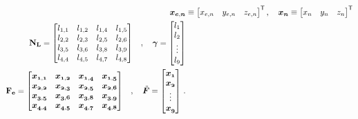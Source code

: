 \begin{subequations}
    \begin{align}
        \vec{x_{e,n}} & \equiv	\begin{bmatrix}
            x_{e,n} & y_{e,n} & z_{e,n}
        \end{bmatrix}^{\mathsf{T}}, \quad
        \vec{x_{n}} \equiv	\begin{bmatrix}
            x_{n} & y_{n} & z_{n}
        \end{bmatrix}^{\mathsf{T}}            \\
        \begin{split}
            \mtx{N_{L}} &=	\begin{bmatrix}
                l_{1,1} & l_{1,2} & l_{1,4} & l_{1,5} \\
                l_{2,2} & l_{2,3} & l_{2,5} & l_{2,6} \\
                l_{3,5} & l_{3,6} & l_{3,8} & l_{3,9} \\
                l_{4,4} & l_{4,5} & l_{4,7} & l_{4,8} \\
            \end{bmatrix}
        \end{split}
        , \quad
        \vec{\gamma} =   \begin{bmatrix}
            l_1    \\
            l_2    \\
            \vdots \\
            l_9
        \end{bmatrix}                          \\
        \begin{split}
            \mtx{F_{e}} &=	\begin{bmatrix}
                \vec{x_{1,1}} & \vec{x_{1,2}} & \vec{x_{1,4}} & \vec{x_{1,5}} \\
                \vec{x_{2,2}} & \vec{x_{2,3}} & \vec{x_{2,5}} & \vec{x_{2,6}} \\
                \vec{x_{3,5}} & \vec{x_{3,6}} & \vec{x_{3,8}} & \vec{x_{3,9}} \\
                \vec{x_{4,4}} & \vec{x_{4,5}} & \vec{x_{4,7}} & \vec{x_{4,8}} \\
            \end{bmatrix}
        \end{split}
        ,\quad
        \vec{\tilde{F}} = 	\begin{bmatrix}
            \vec{x_{1}} \\
            \vec{x_{2}} \\
            \vdots      \\
            \vec{x_{9}}
        \end{bmatrix}\,.\label{eq:force_imp}
    \end{align}
\end{subequations}

